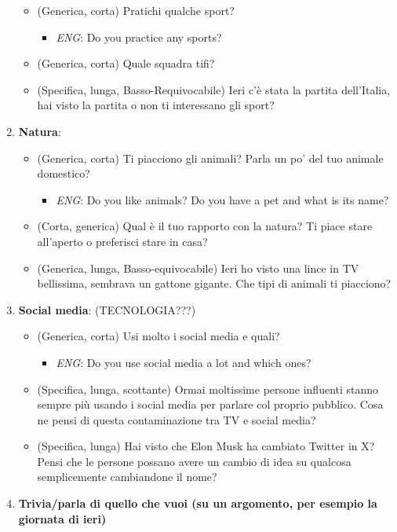\documentclass[
]{article}
\providecommand{\tightlist}{%
  \setlength{\itemsep}{0pt}\setlength{\parskip}{0pt}}
\begin{document}
\begin{enumerate}
  \begin{itemize}
  \tightlist
  \item
    (Generica, corta) Pratichi qualche sport?

    \begin{itemize}
    \tightlist
    \item
      \emph{ENG}: Do you practice any sports?
    \end{itemize}
  \item
    (Generica, corta) Quale squadra tifi?
  \item
    (Specifica, lunga, Basso-Requivocabile) Ieri c'è stata la partita dell'Italia, hai visto la partita o non ti interessano gli sport?\\
  \end{itemize}
\item
  \textbf{Natura}:

  \begin{itemize}
  \tightlist
  \item
    (Generica, corta) Ti piacciono gli animali? Parla un po' del tuo animale domestico?

    \begin{itemize}
    \tightlist
    \item
      \emph{ENG}: Do you like animals? Do you have a pet and what is its name?
    \end{itemize}
  \item
    (Corta, generica) Qual è il tuo rapporto con la natura? Ti piace stare all'aperto o preferisci stare in casa?
  \item
    (Generica, lunga, Basso-equivocabile) Ieri ho visto una lince in TV bellissima, sembrava un gattone gigante. Che tipi di animali ti piacciono?
  \end{itemize}
\item
  \textbf{Social media}: (TECNOLOGIA???)

  \begin{itemize}
  \tightlist
  \item
    (Generica, corta) Usi molto i social media e quali?

    \begin{itemize}
    \tightlist
    \item
      \emph{ENG}: Do you use social media a lot and which ones?
    \end{itemize}
  \item
    (Specifica, lunga, scottante) Ormai moltissime persone influenti stanno sempre più usando i social media per parlare col proprio pubblico. Cosa ne pensi di questa contaminazione tra TV e social media?
  \item
    (Specifica, lunga) Hai visto che Elon Musk ha cambiato Twitter in X? Pensi che le persone possano avere un cambio di idea su qualcosa semplicemente cambiandone il nome?
  \end{itemize}
\item
  \textbf{Trivia/parla di quello che vuoi (su un argomento, per esempio la giornata di ieri)}


\end{enumerate}
\end{document}
